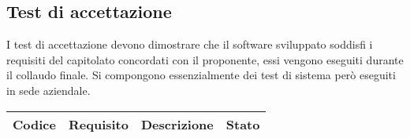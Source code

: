 \subsection{Test di accettazione}
I test di accettazione devono dimostrare che il software sviluppato soddisfi i requisiti del capitolato concordati con il proponente, essi vengono eseguiti durante il collaudo finale.
Si compongono essenzialmente dei test di sistema però eseguiti in sede aziendale.
{
    \setlength{\freewidth}{\dimexpr\textwidth-8\tabcolsep}
    \renewcommand{\arraystretch}{1.5}
    \centering
    \setlength{\aboverulesep}{0pt}
    \setlength{\belowrulesep}{0pt}
    \begin{longtable}{C{.20\freewidth} C{.20\freewidth} C{.50\freewidth} C{.10\freewidth}}
        \toprule 
        \textbf{Codice} & \textbf{Requisito} & \textbf{Descrizione} & \textbf{Stato} \\
        \toprule
        \endhead


\end{longtable}}
